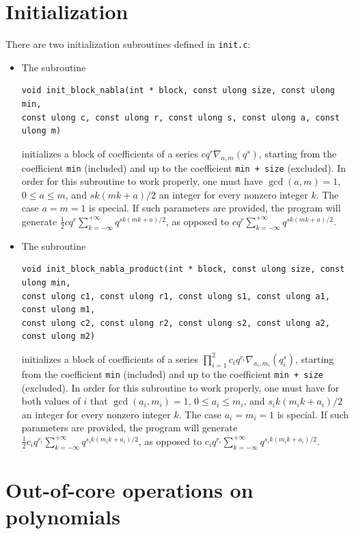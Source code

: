 \documentclass[a4paper,10pt]{article}
\newcommand{\code}{\lstinline}
\begin{document}
\section{Initialization} \label{sec:init}

There are two initialization subroutines defined in \code{init.c}:

\begin{itemize}
\item The subroutine
%
\begin{verbatim}
void init_block_nabla(int * block, const ulong size, const ulong min,
const ulong c, const ulong r, const ulong s, const ulong a, const ulong m)
\end{verbatim}
%
initializes a block of coefficients of a series $cq^{r}\nabla_{a, m}(q^s)$, starting from the coefficient \code{min} (included) and up to the coefficient \code{min + size} (excluded). In order for this subroutine to work properly, one must have $\gcd(a, m) = 1$, $0 \leq a \leq m$, and $sk(mk + a)/2$ an integer for every nonzero integer $k$. The case $a = m = 1$ is special. If such parameters are provided, the program will generate $\frac{1}{2} cq^r\sum_{k = -\infty}^{+\infty}q^{sk(mk + a)/2}$, as opposed to $cq^r\sum_{k = -\infty}^{+\infty}q^{sk(mk + a)/2}$.

\item The subroutine
%
\begin{verbatim}
void init_block_nabla_product(int * block, const ulong size, const ulong min,
const ulong c1, const ulong r1, const ulong s1, const ulong a1, const ulong m1,
const ulong c2, const ulong r2, const ulong s2, const ulong a2, const ulong m2)
\end{verbatim}
%
initializes a block of coefficients of a series $\prod_{i = 1}^2 c_iq^{r_i}\nabla_{a_i, m_i}(q^s_i)$, starting from the coefficient \code{min} (included) and up to the coefficient \code{min + size} (excluded). In order for this subroutine to work properly, one must have for both values of $i$ that $\gcd(a_i, m_i) = 1$, $0 \leq a_i \leq m_i$, and $s_ik(m_ik + a_i)/2$ an integer for every nonzero integer $k$. The case $a_i = m_i = 1$ is special. If such parameters are provided, the program will generate $\frac{1}{2} c_i q^{r_i}\sum_{k = -\infty}^{+\infty}q^{s_ik(m_ik + a_i)/2}$, as opposed to $c_iq^{r_i}\sum_{k = -\infty}^{+\infty}q^{s_ik(m_ik + a_i)/2}$.
\end{itemize}





\section{Out-of-core operations on polynomials} \label{sec:out-of-core}
\end{document}
